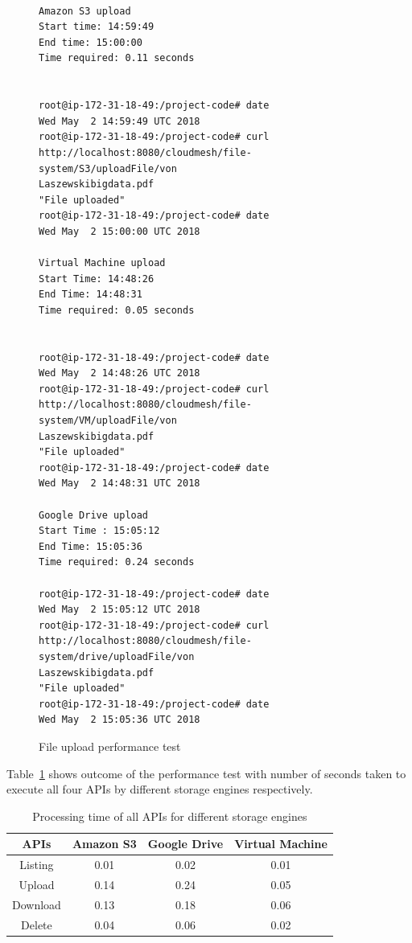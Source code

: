 \begin{figure}[!ht]
\begin{footnotesize}
\begin{verbatim}

Amazon S3 upload 
Start time: 14:59:49		
End time: 15:00:00
Time required: 0.11 seconds


root@ip-172-31-18-49:/project-code# date
Wed May  2 14:59:49 UTC 2018
root@ip-172-31-18-49:/project-code# curl 
http://localhost:8080/cloudmesh/file-system/S3/uploadFile/von
Laszewskibigdata.pdf
"File uploaded"
root@ip-172-31-18-49:/project-code# date
Wed May  2 15:00:00 UTC 2018

Virtual Machine upload
Start Time: 14:48:26		
End Time: 14:48:31
Time required: 0.05 seconds


root@ip-172-31-18-49:/project-code# date
Wed May  2 14:48:26 UTC 2018
root@ip-172-31-18-49:/project-code# curl 
http://localhost:8080/cloudmesh/file-system/VM/uploadFile/von
Laszewskibigdata.pdf
"File uploaded"
root@ip-172-31-18-49:/project-code# date
Wed May  2 14:48:31 UTC 2018

Google Drive upload
Start Time : 15:05:12		
End Time: 15:05:36
Time required: 0.24 seconds

root@ip-172-31-18-49:/project-code# date
Wed May  2 15:05:12 UTC 2018
root@ip-172-31-18-49:/project-code# curl 
http://localhost:8080/cloudmesh/file-system/drive/uploadFile/von
Laszewskibigdata.pdf
"File uploaded"
root@ip-172-31-18-49:/project-code# date
Wed May  2 15:05:36 UTC 2018

\end{verbatim}
\end{footnotesize}
\caption{File upload performance test}\label{fig:upload-test}
\end{figure}


Table~\ref{tab:timing} shows outcome of the performance test 
with number of seconds taken to execute all four APIs by different 
storage engines respectively.

\begin{table}[htb]
\centering
  \caption{Processing time of all APIs for different storage 
  engines}\label{tab:timing}
    \begin{tabular}{*{4}{c}}
    \toprule
    APIs & Amazon S3 & Google Drive & Virtual Machine \\
    \midrule
    Listing & 0.01  & 0.02 & 0.01 \\
    Upload & 0.14 & 0.24 & 0.05 \\
    Download & 0.13 & 0.18 & 0.06 \\
    Delete & 0.04 & 0.06 & 0.02 \\
    \bottomrule
    \end{tabular}
\end{table}



